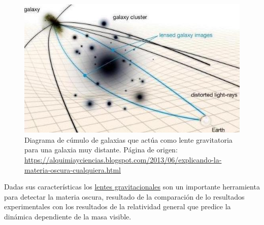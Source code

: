 \begin{figure}[h]
\centering
\includegraphics[width=.6\textwidth]{Fisica_de_Particulas/imagenes/lentes.jpg}
\caption{Diagrama de cúmulo de galaxias que actúa como lente gravitatoria para una galaxia muy distante. %
Página de origen: \url{https://alquimiayciencias.blogspot.com/2013/06/explicando-la-materia-oscura-cualquiera.html}%
}
\label{lentes}
\end{figure}
Dadas sus características los \href{https://curiosoando.com/introduccion-a-las-lentes-gravitacionales}{lentes gravitacionales} son un importante herramienta para detectar la materia oscura, resultado de la comparación de lo resultados experimentales con los resultados de la relatividad general que predice la dinámica dependiente de la masa visible. 



